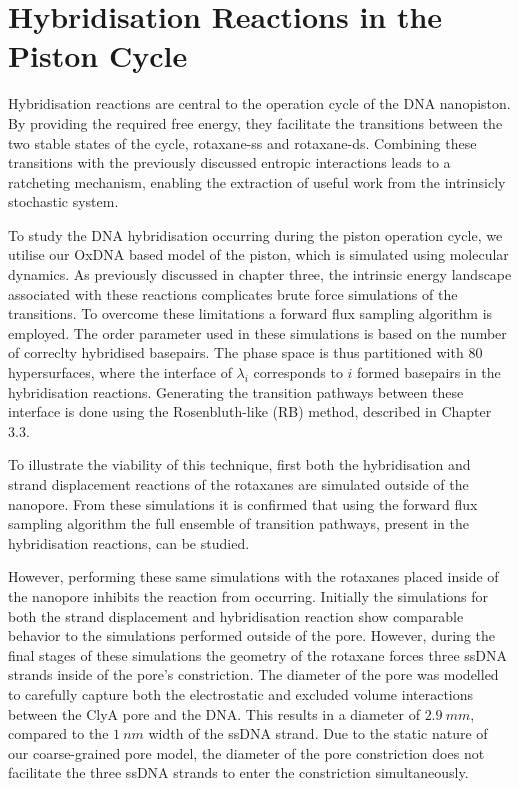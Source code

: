 \section{Hybridisation Reactions in the Piston Cycle}

Hybridisation reactions are central to the operation cycle of the DNA nanopiston. By
providing the required free energy, they facilitate the transitions between the two
stable states of the cycle, rotaxane-ss and rotaxane-ds. Combining these transitions with
the previously discussed entropic interactions leads to a ratcheting mechanism, enabling
the extraction of useful work from the intrinsicly stochastic system.

To study the DNA
hybridisation occurring during the piston operation cycle, we utilise our OxDNA based
model of the piston, which is simulated using molecular dynamics. As previously discussed
in chapter three, the intrinsic energy landscape associated with these reactions
complicates brute force simulations of the transitions. To overcome these limitations a
forward flux sampling algorithm is employed. The order parameter used in these
simulations is based on the number of correclty hybridised basepairs. The phase space is
thus partitioned with $80$ hypersurfaces, where the interface of $\lambda_i$ corresponds
to $i$  formed basepairs in the hybridisation reactions. Generating the transition
pathways between these interface is done using the Rosenbluth-like (RB) method, described
in Chapter 3.3.

To illustrate the viability of this
technique, first both the hybridisation and strand displacement reactions of the
rotaxanes are simulated outside of the nanopore. From these simulations it is
confirmed that using the forward flux sampling algorithm the full ensemble of transition
pathways, present in the hybridisation reactions, can be studied.

However, performing these same simulations with the rotaxanes placed inside of the
nanopore inhibits the reaction from occurring. Initially the simulations for both the
strand displacement and hybridisation reaction show comparable behavior to the
simulations performed outside of the pore. However, during the final stages of these
simulations the geometry of the rotaxane forces three ssDNA strands inside of the pore's
constriction. The diameter of the pore was modelled to carefully capture both the
electrostatic and excluded volume interactions between the ClyA pore and the DNA.
This results in a diameter of $2.9\ mm$, compared to the $1\ nm$ width of the ssDNA
strand.
Due to the static nature of our coarse-grained pore model, the diameter of the pore
constriction does not facilitate the three ssDNA strands to enter the constriction
simultaneously.

